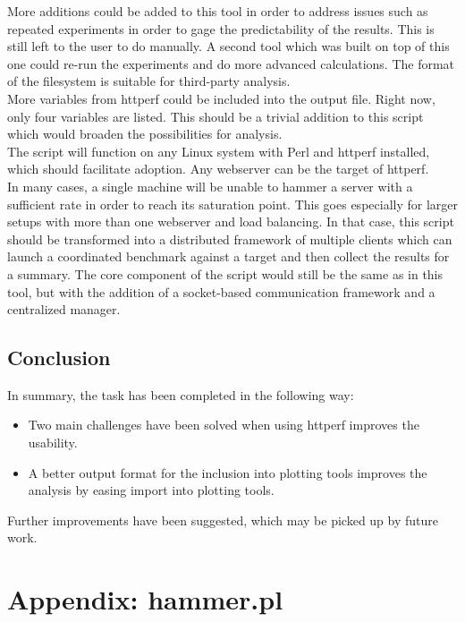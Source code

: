 More additions could be added to this tool in order to address issues such as repeated experiments in order to gage the predictability of the results. This is still left to the user to do manually. A second tool which was built on top of this one could re-run the experiments and do more advanced calculations. The format of the filesystem is suitable for third-party analysis.\\

More variables from httperf could be included into the output file. Right now, only four variables are listed. This should be a trivial addition to this script which would broaden the possibilities for analysis.\\

The script will function on any Linux system with Perl and httperf installed, which should facilitate adoption. Any webserver can be the target of httperf.\\

In many cases, a single machine will be unable to hammer a server with a sufficient rate in order to reach its saturation point. This goes especially for larger setups with more than one webserver and load balancing. In that case, this script should be transformed into a distributed framework of multiple clients which can launch a coordinated benchmark against a target and then collect the results for a summary. The core component of the script would still be the same as in this tool, but with the addition of a socket-based communication framework and a centralized manager.\\

\subsection{Conclusion}

In summary, the task has been completed in the following way: 
\begin{itemize}
	\item Two main challenges have been solved when using httperf improves the usability.
	\item A better output format for the inclusion into plotting tools improves the analysis by easing import into plotting tools.
\end{itemize}
Further improvements have been suggested, which may be picked up by future work. 

\section{Appendix: hammer.pl}

